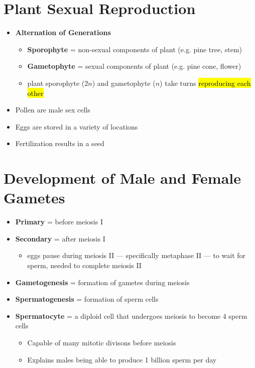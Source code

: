 \documentclass[a4paper,12pt]{article}
\begin{document}
\pagebreak

\section{Plant Sexual Reproduction}
\begin{itemize}
    \item{
            \textbf{Alternation of Generations}
            \begin{itemize}
                \item{\textbf{Sporophyte} = non-sexual components of plant (e.g. pine tree, stem)}
                \item{\textbf{Gametophyte} = sexual components of plant (e.g. pine cone, flower)}
                \item{plant sporophyte ($2n$) and gametophyte ($n$) take turns \hl{reproducing each other}}
            \end{itemize}
        }
    \item{Pollen are \male\! male sex cells}
    \item{\female\! Eggs are stored in a variety of locations}
    \item{Fertilization results in a seed}
\end{itemize}

\section{Development of \male\! Male and \female\! Female Gametes}
\begin{itemize}
    \item{\textbf{Primary} = before meiosis I}
    \item{
            \textbf{Secondary} = after meiosis I
            \begin{itemize}
                \item{eggs pause during meiosis II --- specifically metaphase II --- to wait for sperm, needed to complete meiosis II}
            \end{itemize}
        }
    \item{\textbf{Gametogenesis} = formation of gametes during meiosis}
    \item{\textbf{Spermatogenesis} = formation of sperm cells}
    \item{
            \textbf{Spermatocyte} = a diploid cell that undergoes meiosis to become 4 sperm cells
            \begin{itemize}
                \item{Capable of many mitotic divisons before meiosis}
                \item{Explains males being able to produce 1 billion sperm per day}
            \end{itemize}
        }
\end{itemize}
\end{document}
